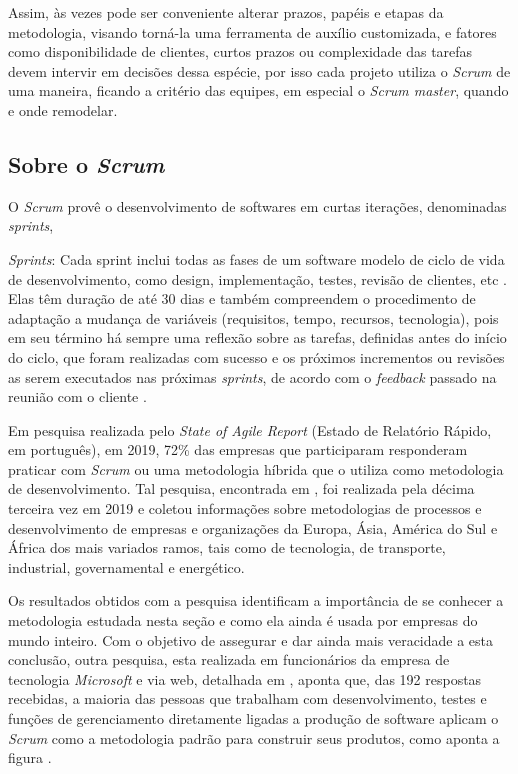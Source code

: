Assim, às vezes pode ser conveniente alterar prazos, papéis e etapas da metodologia, visando torná-la uma ferramenta de auxílio customizada, e fatores como disponibilidade de clientes, curtos prazos ou complexidade das tarefas devem intervir em decisões dessa espécie, por isso cada projeto utiliza o \textit{Scrum} de uma maneira, ficando a critério das equipes, em especial o \textit{Scrum master}, quando e onde remodelar.

\hspace{2.5cm}
\subsection{Sobre o \textit{Scrum}}
\hspace{2.5cm}

O \textit{Scrum} provê o desenvolvimento de softwares em curtas iterações, denominadas \textit{sprints}, 

\textit{Sprints}: Cada sprint inclui todas as fases de um software modelo de ciclo de vida de desenvolvimento, como design, implementação, testes, revisão de clientes, etc \cite{matharu2015empirical}. Elas têm duração de até 30 dias e também compreendem o procedimento de adaptação a mudança de variáveis (requisitos, tempo, recursos, tecnologia), pois em seu término há sempre uma reflexão sobre as tarefas, definidas antes do início do ciclo, que foram realizadas com sucesso e os próximos incrementos ou revisões as serem executados nas próximas \textit{sprints}, de acordo com o \textit{feedback} passado na reunião com o cliente . 


Em pesquisa realizada pelo \textit{State of Agile Report} (Estado de Relatório Rápido, em português), em 2019, 72\% das empresas que participaram responderam praticar com \textit{Scrum} ou uma metodologia híbrida que o utiliza como metodologia de desenvolvimento. Tal pesquisa, encontrada em \cite{relatorioAnual2019}, foi realizada pela décima terceira vez em 2019 e coletou informações sobre metodologias de processos e desenvolvimento de empresas e organizações da Europa, Ásia, América do Sul e África dos mais variados ramos, tais como de tecnologia, de transporte, industrial, governamental e energético.

Os resultados obtidos com a pesquisa identificam a importância de se conhecer a metodologia estudada nesta seção e como ela ainda é usada por empresas do mundo inteiro. Com o objetivo de assegurar e dar ainda mais veracidade a esta conclusão, outra pesquisa, esta realizada em funcionários da empresa de tecnologia \textit{Microsoft} e via web, detalhada em , aponta que, das 192 respostas recebidas, a maioria das pessoas que trabalham com desenvolvimento, testes e funções de gerenciamento diretamente ligadas a produção de software aplicam o \textit{Scrum} como a metodologia padrão para construir seus produtos, como aponta a figura . 


